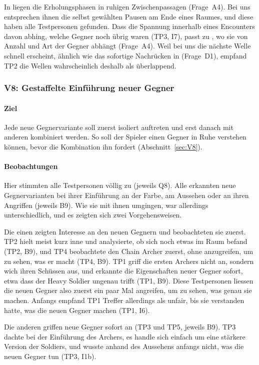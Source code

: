 \documentclass[../Main.tex]{subfiles}
\begin{document}
In  liegen die Erholungsphasen in ruhigen Zwischenpassagen (Frage~A4). Bei uns entsprechen ihnen die selbst gewählten Pausen am Ende eines Raumes, und diese haben alle Testpersonen gefunden. Dass die Spannung innerhalb eines Encounters davon abhing, welche Gegner noch übrig waren (TP3, I7), passt zu , wo sie von Anzahl und Art der Gegner abhängt (Frage~A4). Weil bei uns die nächste Welle schnell erscheint, ähnlich wie das sofortige Nachrücken in  (Frage~D1), empfand TP2 die Wellen wahrscheinlich deshalb als überlappend.

\subsubsection{V8: Gestaffelte Einführung neuer Gegner}

\paragraph{Ziel}
Jede neue Gegnervariante soll zuerst isoliert auftreten und erst danach mit anderen kombiniert werden. So soll der Spieler einen Gegner in Ruhe verstehen können, bevor die Kombination ihn fordert (Abschnitt~\ref{sec:V8}).

\paragraph{Beobachtungen}
Hier stimmten alle Testpersonen völlig zu (jeweils Q8). Alle erkannten neue Gegnervarianten bei ihrer Einführung an der Farbe, am Aussehen oder an ihren Angriffen (jeweils B9). Wie sie mit ihnen umgingen, war allerdings unterschiedlich, und es zeigten sich zwei Vorgehensweisen.

Die einen zeigten Interesse an den neuen Gegnern und beobachteten sie zuerst. TP2 hielt meist kurz inne und analysierte, ob sich noch etwas im Raum befand (TP2, B9), und TP4 beobachtete den Chain Archer zuerst, ohne anzugreifen, um zu sehen, was er macht (TP4, B9). TP1 griff die ersten Archers nicht an, sondern wich ihren Schüssen aus, und erkannte die Eigenschaften neuer Gegner sofort, etwa dass der Heavy Soldier ungenau trifft (TP1, B9). Diese Testpersonen liessen die neuen Gegner also zuerst ein paar Mal angreifen, um zu sehen, was genau sie machen. Anfangs empfand TP1 Treffer allerdings als unfair, bis sie verstanden hatte, was die neuen Gegner machen (TP1, I6).

Die anderen griffen neue Gegner sofort an (TP3 und TP5, jeweils B9). TP3 dachte bei der Einführung des Archers, es handle sich einfach um eine stärkere Version der Soldiers, und wusste anhand des Aussehens anfangs nicht, was die neuen Gegner tun (TP3, I1b).
\end{document}
